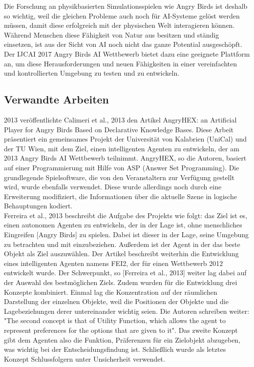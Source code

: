 Die Forschung an physikbasierten Simulationsspielen wie Angry Birds ist deshalb so wichtig, weil die gleichen Probleme auch noch für AI-Systeme gelöst werden müssen, damit diese erfolgreich mit der physischen Welt interagieren können. Während Menschen diese Fähigkeit von Natur aus besitzen und ständig einsetzen, ist aus der Sicht von AI noch nicht das ganze Potential ausgeschöpft. Der IJCAI 2017 Angry Birds AI Wettbewerb bietet dazu eine geeignete Plattform an, um diese Herausforderungen und neuen Fähigkeiten in einer vereinfachten und kontrollierten Umgebung zu testen und zu entwickeln.

\subsection{Verwandte Arbeiten}
2013 veröffentlichte Calimeri et al., 2013 den Artikel \glqq AngryHEX: an Artificial Player for Angry Birds Based on Declarative Knowledge Bases\grqq. Diese Arbeit präsentiert ein gemeinsames Projekt der Universität von Kalabrien (UniCal) und der TU Wien, mit dem Ziel, einen intelligenten Agenten zu entwickeln, der am 2013 Angry Birds AI Wettbewerb teilnimmt. AngryHEX, so die Autoren, basiert auf einer Programmierung mit Hilfe von ASP (Answer Set Programming). Die grundlegende Spielsoftware, die von den Veranstaltern zur Verfügung gestellt wird, wurde ebenfalls verwendet. Diese wurde allerdings noch durch eine Erweiterung modifiziert, die Informationen über die aktuelle Szene in logische Behauptungen kodiert. %
\cite{calimeri2016angry} \\
Ferreira et al., 2013 beschreibt die Aufgabe des Projekts wie folgt: das Ziel ist es, \glqq einen autonomen Agenten zu entwickeln, der in der Lage ist, ohne menschliches Eingreifen [Angry Birds] zu spielen\grqq \cite{ferreira2013combining}. %
Dabei ist dieser in der Lage, seine Umgebung zu betrachten und mit einzubeziehen. Au\ss erdem ist der Agent in der das beste Objekt als Ziel auszuwählen.%
Der Artikel beschreibt weiterhin die Entwicklung eines intelligenten Agenten namens FEI2, der für einen Wettbewerb 2012 entwickelt wurde. Der Schwerpunkt, so [Ferreira et al., 2013] weiter lag dabei auf der Auswahl des bestmöglichen Ziels. Zudem wurden für die Entwicklung drei Konzepte kombiniert. Einmal lag die Konzentration auf der räumlichen Darstellung der einzelnen Objekte, weil die Positionen der Objekte und die Lagebeziehungen derer untereinander wichtig seien. Die Autoren schreiben weiter: "The second concept is that of Utility Function, which allows the agent to represent preferences for the options that are given to it". Das zweite Konzept gibt dem Agenten also die Funktion, Präferenzen für ein Zielobjekt abzugeben, was wichtig bei der Entscheidungsfindung ist. Schlie\ss lich wurde als letztes Konzept Schlussfolgern unter Unsicherheit verwendet. \cite{ferreira2013combining} \\
